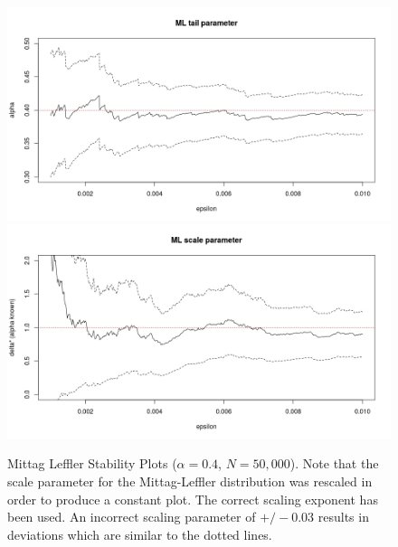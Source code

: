 \documentclass[honours,12pt,twoside, openright]{unswthesis}
\newcommand{\1}{\mathbf 1}
\numberwithin{equation}{section}
\theoremstyle{definition}
\theoremstyle{remark}
\begin{document}


\begin{figure}[h]
    \centering
    \includegraphics[width=\textwidth]{Figures/MLtail01}
    \includegraphics[width=\textwidth]{Figures/MLscale01Fix}
    \caption{Mittag Leffler Stability Plots ($\alpha=0.4$, $N=50,000$). Note that the scale parameter for the Mittag-Leffler distribution was rescaled in order to produce a constant plot. The correct scaling exponent has been used. An incorrect scaling parameter of $+/-0.03$ results in deviations which are similar to the dotted lines.}\label{fig:MLstability}
\end{figure}
\end{document}
